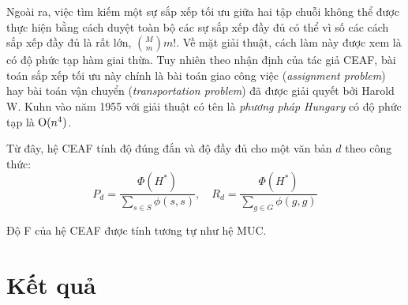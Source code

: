 Ngoài ra, việc tìm kiếm một sự sắp xếp tối ưu giữa hai tập chuỗi không thể được thực hiện bằng cách duyệt toàn bộ các sự sắp xếp đầy đủ có thể vì số các cách sắp xếp đầy đủ là rất lớn, $\binom{M}{m}m!$. Về mặt giải thuật, cách làm này được xem là có độ phức tạp hàm giai thừa. Tuy nhiên theo nhận định của tác giả CEAF, bài toán sắp xếp tối ưu này chính là bài toán giao công việc (\emph{assignment problem}) hay bài toán vận chuyển (\emph{transportation problem}) đã được giải quyết bởi Harold W. Kuhn vào năm 1955 với giải thuật có tên là \emph{phương pháp Hungary} \cite{HungarianMethod} có độ phức tạp là $\operatorname{O}(n^4)$.

Từ đây, hệ CEAF tính độ đúng đắn và độ đầy đủ cho một văn bản $d$ theo công thức:
\[P_d=\frac{\Phi(H^*)}{\sum_{s\in S} \phi(s,s)},\quad R_d=\frac{\Phi(H^*)}{\sum_{g\in G} \phi(g,g)}\]

Độ F của hệ CEAF được tính tương tự như hệ MUC.

\section{Kết quả}
